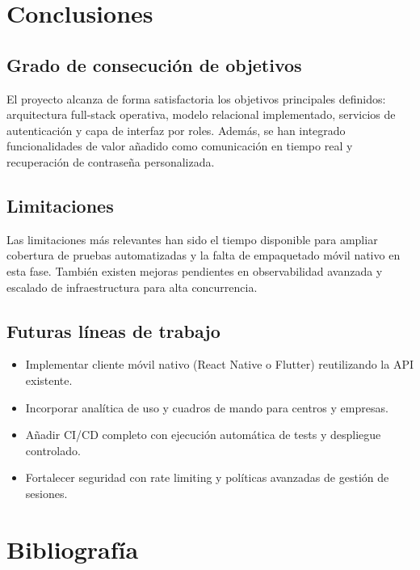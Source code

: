 \documentclass[12pt, a4paper]{report}
\begin{document}
\chapter{Conclusiones}

\section{Grado de consecución de objetivos}

El proyecto alcanza de forma satisfactoria los objetivos principales definidos: arquitectura full-stack
operativa, modelo relacional implementado, servicios de autenticación y capa de interfaz por roles.
Además, se han integrado funcionalidades de valor añadido como comunicación en tiempo real y
recuperación de contraseña personalizada.

\section{Limitaciones}

Las limitaciones más relevantes han sido el tiempo disponible para ampliar cobertura de pruebas
automatizadas y la falta de empaquetado móvil nativo en esta fase. También existen mejoras pendientes
en observabilidad avanzada y escalado de infraestructura para alta concurrencia.

\section{Futuras líneas de trabajo}

\begin{itemize}
  \item Implementar cliente móvil nativo (React Native o Flutter) reutilizando la API existente.
  \item Incorporar analítica de uso y cuadros de mando para centros y empresas.
  \item Añadir CI/CD completo con ejecución automática de tests y despliegue controlado.
  \item Fortalecer seguridad con rate limiting y políticas avanzadas de gestión de sesiones.
\end{itemize}

\chapter{Bibliografía}
\end{document}
